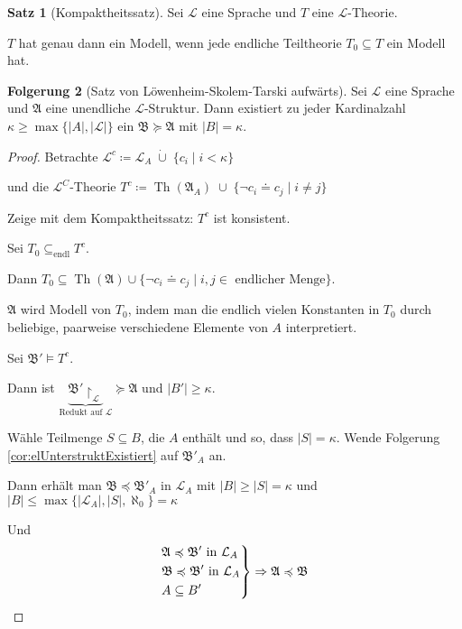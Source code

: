 \documentclass[12pt,parskip=full]{scrartcl}
\newcommand{\abs}[1]{{\left| #1 \right|}}
\theoremstyle{definition}
\newtheorem{theorem}{Satz}[section]
\newtheorem{corollary}[theorem]{Folgerung}
\begin{document}
	\begin{theorem}[Kompaktheitssatz]
		Sei $\mathcal{L}$ eine Sprache und $T$ eine $\mathcal{L}$-Theorie.
		
		$T$ hat genau dann ein Modell, wenn jede endliche Teiltheorie $T_0 \subseteq T$ ein Modell hat.
	\end{theorem}

	\begin{corollary}[Satz von Löwenheim-Skolem-Tarski aufwärts]
		Sei $\mathcal{L}$ eine Sprache und $\mathfrak{A}$ eine unendliche $\mathcal{L}$-Struktur.
		Dann existiert zu jeder Kardinalzahl $\kappa \geq \max \{ \abs{A}, \abs{\mathcal{L}} \}$ ein $\mathfrak{B} \succcurlyeq \mathfrak{A}$ mit $\abs{B} = \kappa$.
	\end{corollary}

	\begin{proof}
		Betrachte $\mathcal{L}^c \coloneqq \mathcal{L}_A \;\dot{\cup}\; \{ c_i \mid i < \kappa \}$
		
		und die $\mathcal{L}^C$-Theorie $T^c \coloneqq \operatorname{Th}(\mathfrak{A}_A) \;\cup\; \{ \lnot c_i \doteq c_j \mid i \neq j \}$
		
		Zeige mit dem Kompaktheitssatz: $T^c$ ist konsistent.
		
		Sei $T_0 \subseteq_\text{endl} T^c$.
		
		Dann $T_0 \subseteq \operatorname{Th}(\mathfrak{A}) \cup \{ \lnot c_i \doteq c_j \mid i,j \in \text{ endlicher Menge} \}$.
		
		$\mathfrak{A}$ wird Modell von $T_0$, indem man die endlich vielen Konstanten in $T_0$ durch beliebige, paarweise verschiedene Elemente von $A$ interpretiert.
		
		Sei $\mathfrak{B}' \models T^c$.
		
		Dann ist $\underbrace{\mathfrak{B}' \upharpoonright_\mathcal{L}}_\text{Redukt auf $\mathcal{L}$} \succcurlyeq \mathfrak{A}$ und $\abs{B'} \geq \kappa$.
		
		Wähle Teilmenge $S \subseteq B$, die $A$ enthält und so, dass $\abs{S} = \kappa$. Wende Folgerung \ref{cor:elUnterstruktExistiert} auf $\mathfrak{B}'_A$ an.
		
		Dann erhält man $\mathfrak{B} \preccurlyeq \mathfrak{B}'_A$ in $\mathcal{L}_A$ mit $\abs{B} \geq \abs{S} = \kappa$ und $\abs{B} \leq \max \{ \abs{\mathcal{L}_A}, \abs{S}, \aleph_0 \} = \kappa$
		
		Und
		\begin{equation*}
			\begin{drcases}
				\mathfrak{A} \preccurlyeq \mathfrak{B}' \text{ in $\mathcal{L}_A$} \\
				\mathfrak{B} \preccurlyeq \mathfrak{B}' \text{ in $\mathcal{L}_A$} \\
				A \subseteq B'
			\end{drcases} \Rightarrow \mathfrak{A} \preccurlyeq \mathfrak{B}
		\end{equation*}
	\end{proof}
\end{document}
